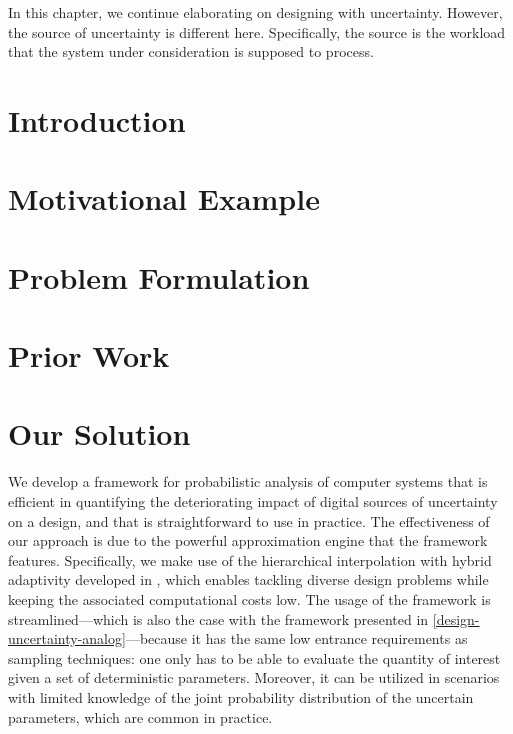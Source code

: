 In this chapter, we continue elaborating on designing with uncertainty. However,
the source of uncertainty is different here. Specifically, the source is the
workload that the system under consideration is supposed to process.

\section{Introduction}

\section{Motivational Example}

\section{Problem Formulation}

\section{Prior Work}

\section{Our Solution}

We develop a framework for probabilistic analysis of computer systems that is
efficient in quantifying the deteriorating impact of digital sources of
uncertainty on a design, and that is straightforward to use
in practice. The effectiveness of our approach is due to the powerful
approximation engine that the framework features. Specifically, we make use of
the hierarchical interpolation with hybrid adaptivity developed in
\cite{klimke2006, ma2009, jakeman2012}, which enables tackling diverse design
problems while keeping the associated computational costs low. The usage of the
framework is streamlined---which is also the case with the framework presented
in \cref{design-uncertainty-analog}---because it has the same low entrance
requirements as sampling techniques: one only has to be able to evaluate the
quantity of interest given a set of deterministic parameters. Moreover, it can
be utilized in scenarios with limited knowledge of the joint probability
distribution of the uncertain parameters, which are common in practice.

